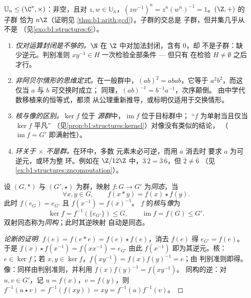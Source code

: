 \begin{example}\label{ex:b1:structures:subgroups}
$\mathbb{U}_n \leq (\C^*, \times)$：非空，且对 $z, w \in
\mathbb{U}_n$，$(zw^{-1})^n = z^n (w^n)^{-1} = 1$。$(\Z, +)$ 的子群
恰为 $n\Z$（证明见
\cref{thm:b1:arith:gcd}）。子群的交总是
子群，但并集几乎从不是
（见\cref{exo:b1:structures:6}）。
\end{example}

\begin{remark}[结构的常见误区]\label{rem:b1:structures:pitfalls}
\begin{enumerate}
  \item \emph{仅对运算封闭是不够的。}$\N$ 在
        $\Z$ 中对加法封闭，含有 $0$，却
        不是子群：缺少逆元。判别准则
        $xy^{-1} \in H$ 一次检验全部条件 --- 但只有
        在检验 $H \neq \emptyset$ 之后才行。
  \item \emph{非阿贝尔情形的思维定式。}在一般群中，$(ab)^2 =
        abab$，它等于 $a^2b^2$，而这仅当 $a$ 与 $b$ 可交换时成立；
        同理，$(ab)^{-1} = b^{-1}a^{-1}$，次序颠倒。
        由中学代数移植来的恒等式，都须
        从公理重新推导，或标明仅适用于交换情形。
  \item \emph{核与像的区别。}$\ker f$ 位于
        \emph{源群}中，$\operatorname{im} f$ 位于目标群中；
        “$f$ 为单射当且仅当 $\ker f$ 平凡”
        （见\cref{prop:b1:structures:kernel}）对像没有类似的结论，
        （$\operatorname{im} f = G'$ 即满射性）。
  \item \emph{环关于 $\times$ 不是群。}在环中，多数
        元素未必可逆，而用 $a$ 消去时
        要求 $a$ 为可逆元，或环为整
        环。例如在 $\Z/12\Z$ 中，$\overline3\,\overline2 =
        \overline3\,\overline6$，但 $\overline2 \neq \overline6$
        （见\cref{ex:b1:structures:zncomputation}）。
\end{enumerate}
\end{remark}

\begin{definition}[群同态]\label{def:b1:structures:morphism}
设 $(G, *)$ 与 $(G', \star)$ 为群，映射 $f \colon G \to G'$
为\emph{同态}，当
\[
\forall x, y \in G, \qquad f(x * y) = f(x) \star f(y).
\]
此时 $f(e_G) = e_{G'}$ 且 $f(x^{-1}) = f(x)^{-1}$。
$f$ 的\emph{核}与\emph{像}为
\[
\ker f = f^{-1}(\{e_{G'}\}) \leq G,
\qquad
\operatorname{im} f = f(G) \leq G' .
\]
双射同态称为\emph{同构}；此时其逆映射
自动是同态。
\end{definition}

\begin{proof}[论断的证明]
$f(e) = f(e * e) = f(e)\star f(e)$，消去 $f(e)$ 得
$e_{G'} = f(e)$。于是 $f(x)\star f(x^{-1}) = f(x x^{-1}) = e_{G'}$
由此 $f(x^{-1})$ 即为其逆元。核：$e \in \ker f$；若
$x, y \in \ker f$，$f(xy^{-1}) = f(x)f(y)^{-1} = e$；由
判别准则即得。像：同样由判别准则，并利用 $f(x)f(y)^{-1} = f(xy^{-1})$。
同构的逆：对 $u, v \in G'$，记 $u = f(x)$，$v =
f(y)$，则 $f^{-1}(u \star v) = f^{-1}(f(xy)) = xy =
f^{-1}(u) f^{-1}(v)$。
\end{proof}

